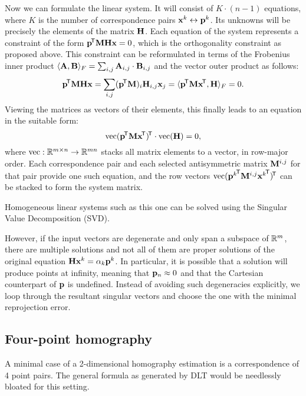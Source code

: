 Now we can formulate the linear system.
It will consist of $K \cdot (n - 1)$ equations, where $K$ is the number of correspondence pairs $\mathbf{x}^k \leftrightarrow \mathbf{p}^k$.
Its unknowns will be precisely the elements of the matrix $\mathbf{H}$.
Each equation of the system represents a constraint of the form $\mathbf{p}^{\!\mathsf{T}} \mathbf{M} \mathbf{H} \mathbf{x} = 0$, which is the orthogonality constraint as proposed above.
This constraint can be reformulated in terms of the Frobenius inner product $\langle \mathbf{A}, \mathbf{B} \rangle_F = \sum_{i, j} \mathbf{A}_{i, j} \cdot \mathbf{B}_{i, j}$ and the vector outer product as follows:
$$\mathbf{p}^{\!\mathsf{T}} \mathbf{M} \mathbf{H} \mathbf{x} = \sum_{i, j} (\mathbf{p}^{\!\mathsf{T}} \mathbf{M})_i \mathbf{H}_{i, j} \mathbf{x}_j = \langle \mathbf{p}^{\!\mathsf{T}} \mathbf{M} \mathbf{x}^{\!\mathsf{T}}, \mathbf{H} \rangle_F = 0.$$
Viewing the matrices as vectors of their elements, this finally leads to an equation in the suitable form:
$$\textrm{vec} (\mathbf{p}^{\!\mathsf{T}} \mathbf{M} \mathbf{x}^{\!\mathsf{T}})^{\!\mathsf{T}} \cdot \textrm{vec}(\mathbf{H}) = 0,$$
where $\textrm{vec} : \mathbb{R}^{m \times n} \rightarrow \mathbb{R}^{mn}$ stacks all matrix elements to a vector, in row-major order.
Each correspondence pair and each selected antisymmetric matrix $\mathbf{M}^{i, j}$ for that pair provide one such equation, and the row vectors $\textrm{vec} ({\mathbf{p}^k}^{\!\mathsf{T}} \mathbf{M}^{i, j} {\mathbf{x}^k}^{\!\mathsf{T}})^{\!\mathsf{T}}$ can be stacked to form the system matrix.

Homogeneous linear systems such as this one can be solved using the Singular Value Decomposition (SVD).

\todo{\dots}
However, if the input vectors are degenerate and only span a subspace of $\mathbb{R}^m$, there are multiple solutions and not all of them are proper solutions of the original equation $\mathbf{H} \mathbf{x}^k = \alpha_k \mathbf{p}^k$.
In particular, it is possible that a solution will produce points at infinity, meaning that $\mathbf{p}_n \approx 0$ and that the Cartesian counterpart of $\mathbf{p}$ is undefined.
Instead of avoiding such degeneracies explicitly, we loop through the resultant singular vectors and choose the one with the minimal reprojection error.


\subsection{Four-point homography}

A minimal case of a 2-dimensional homography estimation is a correspondence of 4 point pairs.
The general formula as generated by DLT would be needlessly bloated for this setting.

